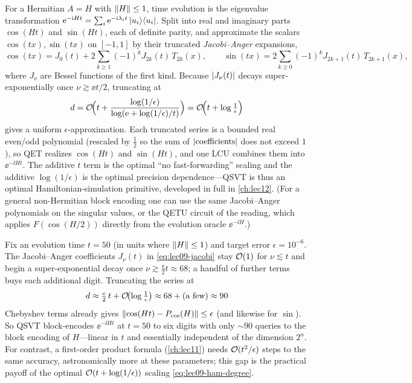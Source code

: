For a Hermitian $A=H$ with $\left\lVert H \right\rVert\le1$, time evolution is the eigenvalue
transformation $\mathrm{e}^{-\mathrm{i} Ht}=\sum_i\mathrm{e}^{-\mathrm{i}\lambda_i t}\ket{u_i}\!\bra{u_i}$. Split into real
and imaginary parts $\cos(Ht)$ and $\sin(Ht)$, each of definite parity, and approximate
the scalars $\cos(tx),\sin(tx)$ on $[-1,1]$ by their truncated \emph{Jacobi--Anger}
expansions,
\begin{equation}
  \cos(tx)=J_0(t)+2\sum_{k\ge1}(-1)^{k}J_{2k}(t)\,T_{2k}(x),\qquad
  \sin(tx)=2\sum_{k\ge0}(-1)^{k}J_{2k+1}(t)\,T_{2k+1}(x),
  \label{eq:lec09-jacobi}
\end{equation}
where $J_\nu$ are Bessel functions of the first kind. Because $\left\lvert J_\nu(t) \right\rvert$ decays
super-exponentially once $\nu\gtrsim \ee t/2$, truncating at
\begin{equation}
  d=\mathcal{O}\!\Bigl(t+\frac{\log(1/\epsilon)}{\log(\mathrm{e}+\log(1/\epsilon)/t)}\Bigr)
   =\mathcal{O}\!\Bigl(t+\log\tfrac1\epsilon\Bigr)
  \label{eq:lec09-ham-degree}
\end{equation}
gives a uniform $\epsilon$-approximation. Each truncated series is a bounded real
even/odd polynomial (rescaled by $\tfrac12$ so the sum of $\left\lvert \text{coefficients} \right\rvert$
does not exceed $1$), so QET realizes $\cos(Ht)$ and $\sin(Ht)$, and one LCU combines
them into $\ee^{-\ii Ht}$. The additive $t$ term is the optimal ``no fast-forwarding''
scaling and the additive $\log(1/\epsilon)$ is the optimal precision dependence---QSVT
is thus an optimal Hamiltonian-simulation primitive, developed in full in
\cref{ch:lec12}. (For a general non-Hermitian block encoding one can use the same
Jacobi--Anger polynomials on the singular values, or the QETU circuit of the
reading, which applies $F(\cos(H/2))$ directly from the evolution oracle $\ee^{-\ii
H}$.)

\begin{example}
\label{exa:lec09-ham}
Fix an evolution time $t=50$ (in units where $\left\lVert H \right\rVert\le1$) and target error
$\epsilon=10^{-6}$. The Jacobi--Anger coefficients $J_\nu(t)$ in
\eqref{eq:lec09-jacobi} stay $\mathcal{O}(1)$ for $\nu\lesssim t$ and begin a
super-exponential decay once $\nu\gtrsim\tfrac{\ee}{2}t\approx68$; a handful of
further terms buys each additional digit. Truncating the series at
\[
  d\approx\tfrac{\mathrm{e}}{2}\,t+\mathcal{O}\!\bigl(\log\tfrac1\epsilon\bigr)\approx 68+\text{(a
  few)}\approx 90
\]
Chebyshev terms already gives $\left\lVert \cos(Ht)-P_{\cos}(H) \right\rVert\le\epsilon$ (and likewise
for $\sin$). So QSVT block-encodes $\ee^{-\ii Ht}$ at $t=50$ to six digits with only
$\sim\!90$ queries to the block encoding of $H$---linear in $t$ and essentially
independent of the dimension $2^n$. For contrast, a first-order product formula
(\cref{ch:lec11}) needs $\mathcal{O}(t^2/\epsilon)$ steps to the same accuracy,
astronomically more at these parameters; this gap is the practical payoff of the
optimal $\mathcal{O}(t+\log(1/\epsilon))$ scaling \eqref{eq:lec09-ham-degree}.
\end{example}

